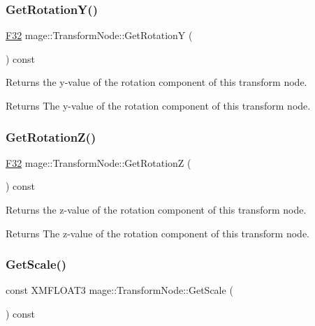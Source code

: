 \subsubsection{\texorpdfstring{Get\+Rotation\+Y()}{GetRotationY()}}
{\footnotesize\ttfamily \hyperlink{namespacemage_aa97e833b45f06d60a0a9c4fc22ae02c0}{F32} mage\+::\+Transform\+Node\+::\+Get\+RotationY (\begin{DoxyParamCaption}{ }\end{DoxyParamCaption}) const\hspace{0.3cm}{\ttfamily [noexcept]}}

Returns the y-\/value of the rotation component of this transform node.

\begin{DoxyReturn}{Returns}
The y-\/value of the rotation component of this transform node. 
\end{DoxyReturn}
\hypertarget{structmage_1_1_transform_node_a3c08b93f62e5d741c95a97ae9b42e039}{}\label{structmage_1_1_transform_node_a3c08b93f62e5d741c95a97ae9b42e039} 
\subsubsection{\texorpdfstring{Get\+Rotation\+Z()}{GetRotationZ()}}
{\footnotesize\ttfamily \hyperlink{namespacemage_aa97e833b45f06d60a0a9c4fc22ae02c0}{F32} mage\+::\+Transform\+Node\+::\+Get\+RotationZ (\begin{DoxyParamCaption}{ }\end{DoxyParamCaption}) const\hspace{0.3cm}{\ttfamily [noexcept]}}

Returns the z-\/value of the rotation component of this transform node.

\begin{DoxyReturn}{Returns}
The z-\/value of the rotation component of this transform node. 
\end{DoxyReturn}
\hypertarget{structmage_1_1_transform_node_a23109efb661cb17d3957286952334dc2}{}\label{structmage_1_1_transform_node_a23109efb661cb17d3957286952334dc2} 
\subsubsection{\texorpdfstring{Get\+Scale()}{GetScale()}}
{\footnotesize\ttfamily const X\+M\+F\+L\+O\+A\+T3 mage\+::\+Transform\+Node\+::\+Get\+Scale (\begin{DoxyParamCaption}{ }\end{DoxyParamCaption}) const\hspace{0.3cm}{\ttfamily [noexcept]}}

